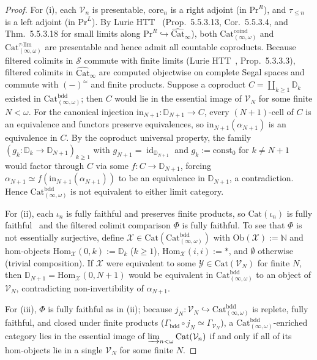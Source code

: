 \documentclass[11pt]{article}
\theoremstyle{plain}
\theoremstyle{definition}
\newcommand{\Ob}{\mathrm{Ob}}
\newcommand{\Hom}{\mathrm{Hom}}
\newcommand{\Cat}{\mathrm{Cat}}
\DeclareMathOperator{\id}{id}
\begin{document}
\begin{proof}
For (i), each $\mathcal{V}_n$ is presentable, $\mathrm{core}_n$ is a right adjoint (in $\mathrm{Pr}^R$), and $\tau_{\le n}$ is a left adjoint (in $\mathrm{Pr}^L$). By Lurie HTT~\cite{LurieHTT} (Prop.~5.5.3.13, Cor.~5.5.3.4, and Thm.~5.5.3.18 for small limits along $\mathrm{Pr}^R \hookrightarrow \widehat{\Cat}_\infty$), both $\Cat_{(\infty,\omega)}^{\mathrm{coind}}$ and $\Cat_{(\infty,\omega)}^{\tau\text{-}\mathrm{lim}}$ are presentable and hence admit all countable coproducts. Because filtered colimits in $\mathcal{S}$ commute with finite limits (Lurie HTT~\cite{LurieHTT}, Prop.~5.3.3.3), filtered colimits in $\widehat{\Cat}_\infty$ are computed objectwise on complete Segal spaces and commute with $(-)^{\simeq}$ and finite products. Suppose a coproduct $C = \coprod_{k \ge 1} \mathbb{D}_k$ existed in $\Cat_{(\infty,\omega)}^{\mathrm{bdd}}$; then $C$ would lie in the essential image of $\mathcal{V}_N$ for some finite $N < \omega$. For the canonical injection $\mathrm{in}_{N+1} : \mathbb{D}_{N+1} \to C$, every $(N+1)$-cell of $C$ is an equivalence and functors preserve equivalences, so $\mathrm{in}_{N+1}(\alpha_{N+1})$ is an equivalence in $C$. By the coproduct universal property, the family $(g_k : \mathbb{D}_k \to \mathbb{D}_{N+1})_{k \ge 1}$ with $g_{N+1} = \id_{\mathbb{D}_{N+1}}$ and $g_k := \mathrm{const}_0$ for $k \neq N+1$ would factor through $C$ via some $f : C \to \mathbb{D}_{N+1}$, forcing $\alpha_{N+1} \simeq f(\mathrm{in}_{N+1}(\alpha_{N+1}))$ to be an equivalence in $\mathbb{D}_{N+1}$, a contradiction. Hence $\Cat_{(\infty,\omega)}^{\mathrm{bdd}}$ is not equivalent to either limit category.

For (ii), each $\iota_n$ is fully faithful and preserves finite products, so $\Cat(\iota_n)$ is fully faithful~\cite{GepnerHaugseng2015} and the filtered colimit comparison $\Phi$ is fully faithful. To see that $\Phi$ is not essentially surjective, define $\mathcal{X} \in \Cat(\Cat_{(\infty,\omega)}^{\mathrm{bdd}})$ with $\Ob(\mathcal{X}) := \mathbb{N}$ and hom-objects $\Hom_{\mathcal{X}}(0, k) := \mathbb{D}_k$ ($k \ge 1$), $\Hom_{\mathcal{X}}(i, i) := *$, and $\emptyset$ otherwise (trivial composition). If $\mathcal{X}$ were equivalent to some $\mathcal{Y} \in \Cat(\mathcal{V}_N)$ for finite $N$, then $\mathbb{D}_{N+1} = \Hom_{\mathcal{X}}(0, N+1)$ would be equivalent in $\Cat_{(\infty,\omega)}^{\mathrm{bdd}}$ to an object of $\mathcal{V}_N$, contradicting non-invertibility of $\alpha_{N+1}$.

For (iii), $\Phi$ is fully faithful as in (ii); because $j_N : \mathcal{V}_N \hookrightarrow \Cat_{(\infty,\omega)}^{\mathrm{bdd}}$ is replete, fully faithful, and closed under finite products ($\Gamma_{\mathrm{bdd}} \circ j_N \simeq \Gamma_{\mathcal{V}_N}$), a $\Cat_{(\infty,\omega)}^{\mathrm{bdd}}$-enriched category lies in the essential image of $\varinjlim_{n < \omega} \Cat(\mathcal{V}_n)$ if and only if all of its hom-objects lie in a single $\mathcal{V}_N$ for some finite $N$.
\end{proof}
\end{document}
